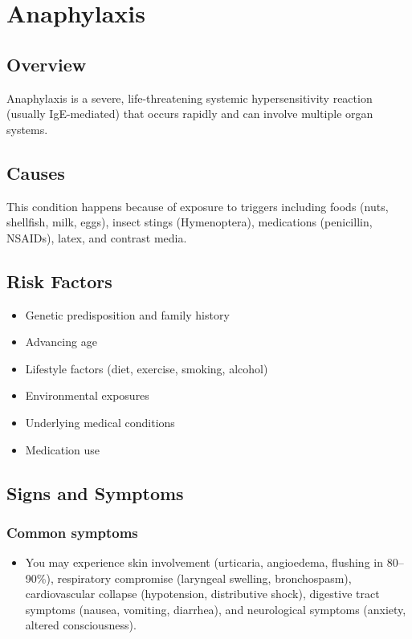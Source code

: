 \chapter{Anaphylaxis}
\label{sec:Anaphylaxis}

\section{Overview}
Anaphylaxis is a severe, life-threatening systemic hypersensitivity reaction (usually IgE-mediated) that occurs rapidly and can involve multiple organ systems.
\section{Causes}
This condition happens because of exposure to triggers including foods (nuts, shellfish, milk, eggs), insect stings (Hymenoptera), medications (penicillin, NSAIDs), latex, and contrast media.     
\section{Risk Factors}

\begin{itemize}[noitemsep]
  \item Genetic predisposition and family history
  \item Advancing age
  \item Lifestyle factors (diet, exercise, smoking, alcohol)
  \item Environmental exposures
  \item Underlying medical conditions
  \item Medication use
\end{itemize}
\section{Signs and Symptoms}

\subsection{Common symptoms}
\begin{itemize}[noitemsep]
  \item You may experience skin involvement (urticaria, angioedema, flushing in 80--90\%), respiratory compromise (laryngeal swelling, bronchospasm), cardiovascular collapse (hypotension, distributive shock), digestive tract symptoms (nausea, vomiting, diarrhea), and neurological symptoms (anxiety, altered consciousness). 
  \end{itemize}


